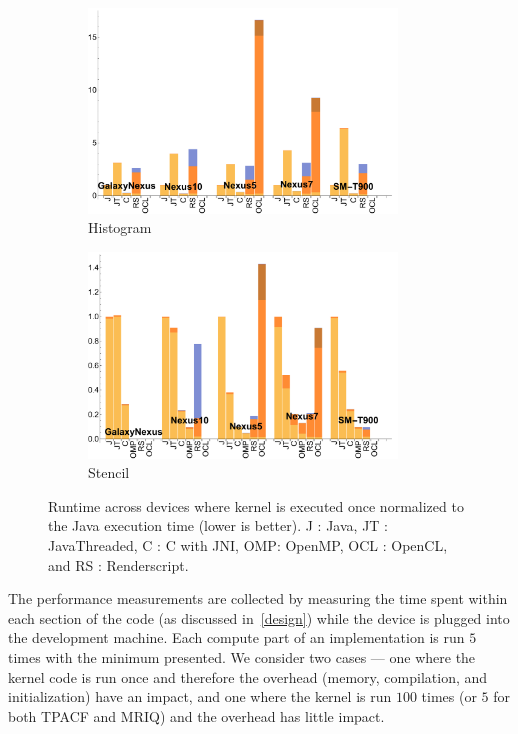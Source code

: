 \begin{figure}[t]
  \begin{subfigure}[b]{0.5\textwidth}
      \centering
      \includegraphics[width=0.9\textwidth]{data/Histogram_onecompute_time.pdf}
      \caption{Histogram}\label{fig:histo}
  \end{subfigure}
  \begin{subfigure}[b]{0.5\textwidth}
      \centering
      \includegraphics[width=0.9\textwidth]{data/Stencil_onecompute_time.pdf}
      \caption{Stencil}
      \label{fig:Stencil}
  \end{subfigure}

  \caption{Runtime across devices where kernel is executed once normalized to the Java execution time (lower is better). J : Java, JT : JavaThreaded, C : C with JNI, OMP: OpenMP, OCL : OpenCL, and RS : Renderscript.}
\end{figure}
\FloatBarrier

The performance measurements are collected by measuring the time
  spent within each section of the code (as discussed in~\ref{design})
  while the device is plugged into the development machine.
Each compute part of an implementation is run $5$ times with the minimum
  presented.
We consider two cases --- one where the kernel code is run once and therefore
  the overhead (memory, compilation, and initialization) have an impact,
  and one where the kernel is run $100$ times (or $5$ for both TPACF and MRIQ)
  and the overhead has little impact.



